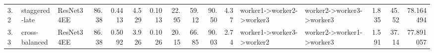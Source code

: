 \begin{table}
\begin{tabular}{lllrrrrrrrrllrrr}
       3.2 & staggered-late & ResNet34EE &     86.38 &          0.4413 &       4.529 &                      0.1013 &                             22.95 &         59.12 &         90.50 &          4.37 & worker1->worker2->worker3 & worker2->worker3->worker3 &            1.835 &                         45.52 &                             78.164494 \\
       3.3 & cross-balanced & ResNet34EE &     86.38 &          0.5092 &       3.926 &                      0.1026 &                             20.15 &         66.85 &         90.03 &          2.74 & worker1->worker3->worker2 & worker2->worker1->worker3 &            1.591 &                         37.14 &                             77.891057 \\
\bottomrule
\end{tabular}
\end{table}
